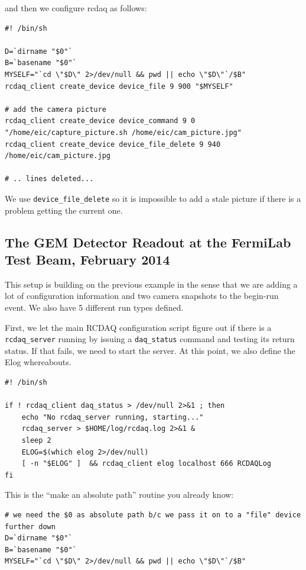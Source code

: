 \documentclass{article}[11pt]
\begin{document}
and then we configure rcdaq as follows:
\label{packet900}

\begin{verbatim} 
#! /bin/sh

D=`dirname "$0"`
B=`basename "$0"`
MYSELF="`cd \"$D\" 2>/dev/null && pwd || echo \"$D\"`/$B"
rcdaq_client create_device device_file 9 900 "$MYSELF"

# add the camera picture
rcdaq_client create_device device_command 9 0 "/home/eic/capture_picture.sh /home/eic/cam_picture.jpg"
rcdaq_client create_device device_file_delete 9 940 /home/eic/cam_picture.jpg

# .. lines deleted...
\end{verbatim}

We use \verb|device_file_delete| so it is impossible to add a stale
picture if there is a problem getting the current one.

\subsection{The GEM Detector Readout at the FermiLab Test Beam, February 2014}

This setup is building on the previous example in the sense that 
we are adding a lot of configuration information and two camera 
snapshots to the begin-run event. We also have 5 different run types defined.

First, we let the main RCDAQ configuration script figure out if there
is a \verb|rcdaq_server| running by issuing a \verb|daq_status|
command and testing its return status. If that fails, we need to start
the server. At this point, we also define the Elog whereabouts.

\begin{verbatim} 
#! /bin/sh

if ! rcdaq_client daq_status > /dev/null 2>&1 ; then
    echo "No rcdaq_server running, starting..."
    rcdaq_server > $HOME/log/rcdaq.log 2>&1 &
    sleep 2
    ELOG=$(which elog 2>/dev/null)
    [ -n "$ELOG" ]  && rcdaq_client elog localhost 666 RCDAQLog
fi
\end{verbatim} 

This is the ``make an absolute path'' routine you already know:

\begin{verbatim} 
# we need the $0 as absolute path b/c we pass it on to a "file" device further down
D=`dirname "$0"`
B=`basename "$0"`
MYSELF="`cd \"$D\" 2>/dev/null && pwd || echo \"$D\"`/$B"
\end{verbatim} 
\end{document}
